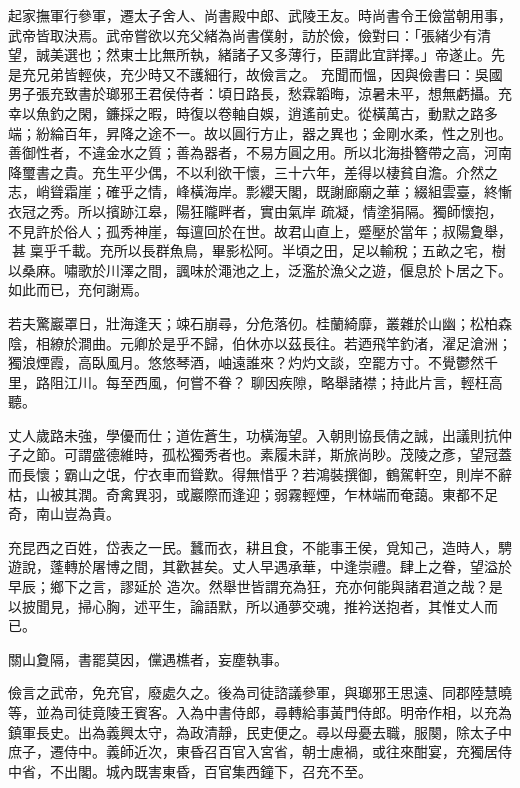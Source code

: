 \begin{pinyinscope}
 起家撫軍行參軍，遷太子舍人、尚書殿中郎、武陵王友。時尚書令王儉當朝用事，武帝皆取決焉。武帝嘗欲以充父緒為尚書僕射，訪於儉，儉對曰：「張緒少有清望，誠美選也；然東士比無所執，緒諸子又多薄行，臣謂此宜詳擇。」帝遂止。先是充兄弟皆輕俠，充少時又不護細行，故儉言之。
 充聞而慍，因與儉書曰：吳國男子張充致書於瑯邪王君侯侍者：頃日路長，愁霖韜晦，涼暑未平，想無虧攝。充幸以魚釣之閑，鐮採之暇，時復以卷軸自娛，逍遙前史。從橫萬古，動默之路多端；紛綸百年，昇降之途不一。故以圓行方止，器之異也；金剛水柔，性之別也。善御性者，不違金水之質；善為器者，不易方圓之用。所以北海掛簪帶之高，河南降璽書之貴。充生平少偶，不以利欲干懷，三十六年，差得以棲貧自澹。介然之志，峭聳霜崖；確乎之情，峰橫海岸。彯纓天閣，既謝廊廟之華；綴組雲臺，終慚衣冠之秀。所以擯跡江皋，陽狂隴畔者，實由氣岸
 疏凝，情塗狷隔。獨師懷抱，不見許於俗人；孤秀神崖，每邅回於在世。故君山直上，蹙壓於當年；叔陽夐舉，甚稟乎千載。充所以長群魚鳥，畢影松阿。半頃之田，足以輸稅；五畝之宅，樹以桑麻。嘯歌於川澤之間，諷味於澠池之上，泛濫於漁父之遊，偃息於卜居之下。如此而已，充何謝焉。



 若夫驚巖罩日，壯海逢天；竦石崩尋，分危落仞。桂蘭綺靡，叢雜於山幽；松柏森陰，相繚於澗曲。元卿於是乎不歸，伯休亦以茲長往。若迺飛竿釣渚，濯足滄洲；獨浪煙霞，高臥風月。悠悠琴酒，岫遠誰來？灼灼文談，空罷方寸。不覺鬱然千里，路阻江川。每至西風，何嘗不眷？
 聊因疾隙，略舉諸襟；持此片言，輕枉高聽。



 丈人歲路未強，學優而仕；道佐蒼生，功橫海望。入朝則協長倩之誠，出議則抗仲子之節。可謂盛德維時，孤松獨秀者也。素履未詳，斯旅尚眇。茂陵之彥，望冠蓋而長懷；霸山之氓，佇衣車而聳歎。得無惜乎？若鴻裝撰御，鶴駕軒空，則岸不辭枯，山被其潤。奇禽異羽，或巖際而逢迎；弱霧輕煙，乍林端而奄藹。東都不足奇，南山豈為貴。



 充昆西之百姓，岱表之一民。蠶而衣，耕且食，不能事王侯，覓知己，造時人，騁遊說，蓬轉於屠博之間，其歡甚矣。丈人早遇承華，中逢崇禮。肆上之眷，望溢於早辰；鄉下之言，謬延於
 造次。然舉世皆謂充為狂，充亦何能與諸君道之哉？是以披聞見，掃心胸，述平生，論語默，所以通夢交魂，推衿送抱者，其惟丈人而已。



 關山夐隔，書罷莫因，儻遇樵者，妄塵執事。



 儉言之武帝，免充官，廢處久之。後為司徒諮議參軍，與瑯邪王思遠、同郡陸慧曉等，並為司徒竟陵王賓客。入為中書侍郎，尋轉給事黃門侍郎。明帝作相，以充為鎮軍長史。出為義興太守，為政清靜，民吏便之。尋以母憂去職，服闋，除太子中庶子，遷侍中。義師近次，東昏召百官入宮省，朝士慮禍，或往來酣宴，充獨居侍中省，不出閣。城內既害東昏，百官集西鐘下，召充不至。




\end{pinyinscope}

